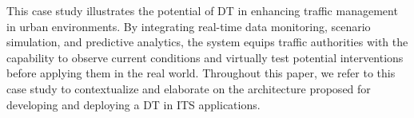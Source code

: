 This case study illustrates the potential of DT in enhancing traffic management in urban environments. By integrating real-time data monitoring, scenario simulation, and predictive analytics, the system equips traffic authorities with the capability to observe current conditions and virtually test potential interventions before applying them in the real world. Throughout this paper, we refer to this case study to contextualize and elaborate on the architecture proposed for developing and deploying a DT in ITS applications.

